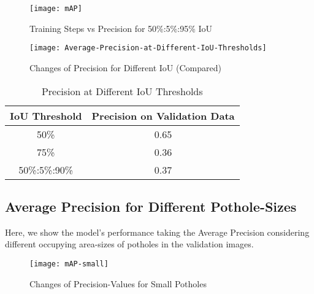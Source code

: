             \begin{figure}
                \centering
                \texttt{[image: mAP]}
                \caption{Training Steps vs Precision for 50\%:5\%:95\% IoU}
                \label{fig:precision_ioucoco}
            \end{figure}
            
            \begin{figure}
                \centering
                \texttt{[image: Average-Precision-at-Different-IoU-Thresholds]}
                \caption{Changes of Precision for Different IoU (Compared)}
                \label{fig:precision_iou}
            \end{figure}
            
            \begin{table}
                \centering
                \begin{tabular}{|c||c|} \hline 
                     IoU Threshold  &  Precision on Validation Data \\\hline\hline
                     50\%  &  0.65 \\\hline
                     75\%  &  0.36 \\\hline
                     50\%:5\%:90\%  &  0.37 \\\hline
                \end{tabular}
                \caption{Precision at Different IoU Thresholds}
                \label{tab:precision_iou}
            \end{table}
            
        \clearpage
        \subsection{Average Precision for Different Pothole-Sizes}
            Here, we show the model's performance taking the Average Precision considering different occupying area-sizes of potholes in the validation images.
            
            \begin{figure}[h]
                \centering
                \texttt{[image: mAP-small]}
                \caption{Changes of Precision-Values for Small Potholes}
                \label{fig:precision_sizes_small}
            \end{figure}
            
